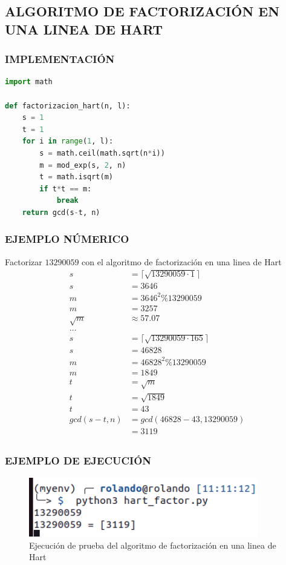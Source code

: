 \subsection{ALGORITMO DE FACTORIZACIÓN EN UNA LINEA DE HART}
\subsubsection{IMPLEMENTACIÓN}
\begin{lstlisting}[language=Python]
import math

def factorizacion_hart(n, l):
    s = 1
    t = 1
    for i in range(1, l):
        s = math.ceil(math.sqrt(n*i))
        m = mod_exp(s, 2, n)
        t = math.isqrt(m)
        if t*t == m:
            break
    return gcd(s-t, n)
\end{lstlisting}
\subsubsection{EJEMPLO NÚMERICO}
    Factorizar $13290059$ con el algoritmo de factorización en una linea de Hart
    \begin{align*} 
        s &=  \lceil \sqrt{13290059\cdot 1}\rceil\\ 
        s &= 3646\\ 
        m &= 3646^2 \% 13290059\\ 
        m &= 3257\\
        \sqrt{m} &\approx  57.07\\
        \dots \\
        s &=  \lceil \sqrt{13290059\cdot 165}\rceil\\ 
        s &= 46828\\ 
        m &= 46828^2 \% 13290059\\
        m &= 1849\\
        t &=  \sqrt{m}\\
        t &=  \sqrt{1849}\\
        t &= 43\\
        gcd(s-t, n) &= gcd(46828-43, 13290059)\\
        &= 3119\\
    \end{align*}

    \subsubsection{EJEMPLO DE EJECUCIÓN}
    \begin{figure}[H]
        \centering
        \includegraphics[width=10cm]{images/hart_prueba.png}
        \caption{Ejecución de prueba del algoritmo de factorización en una linea de Hart}
    \end{figure}


